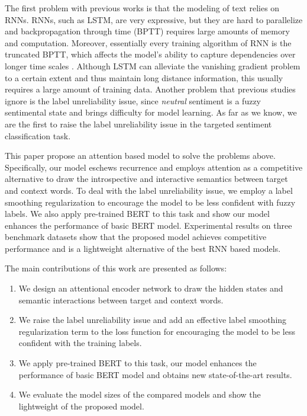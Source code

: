 \documentclass[11pt,a4paper]{article}
\begin{document}
The first problem with previous works is that the modeling of text relies on RNNs.
RNNs, such as LSTM, are very expressive, but they are hard to parallelize and backpropagation through time (BPTT) requires large amounts of memory and computation.
Moreover, essentially every training algorithm of RNN is the truncated BPTT, which affects the model's ability to capture dependencies over longer time scales \cite{werbos1990backpropagation}.
Although LSTM can alleviate the vanishing gradient problem to a certain extent and thus maintain long distance information,
this usually requires a large amount of training data.
Another problem that previous studies ignore is the label unreliability issue,
since \textit{neutral} sentiment is a fuzzy sentimental state and brings difficulty for model learning.
As far as we know, we are the first to raise the label unreliability issue in the targeted sentiment classification task.

This paper propose an attention based model to solve the problems above.
Specifically, our model eschews recurrence and employs attention as a competitive alternative to draw the introspective and interactive semantics between target and context words.
To deal with the label unreliability issue, we employ a label smoothing regularization
to encourage the model to be less confident with fuzzy labels.
We also apply pre-trained BERT \cite{devlin2018bert}
to this task and show our model enhances the performance of basic BERT model.
Experimental results on three benchmark datasets show that the proposed model achieves competitive performance and is a lightweight alternative of the best RNN based models.

The main contributions of this work are presented as follows:
\begin{enumerate}
\item We design an attentional encoder network to draw the hidden states and semantic interactions between target and context words.
\item We raise the label unreliability issue and add an effective label smoothing regularization term to the loss function for encouraging the model to be less confident with the training labels.
\item We apply pre-trained BERT to this task, our model enhances the performance of basic BERT model and obtains new state-of-the-art results.
\item We evaluate the model sizes of the compared models and show the lightweight of the proposed model.
\end{enumerate}
\end{document}
